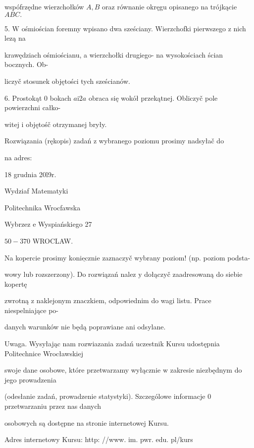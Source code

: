 \documentclass[a4paper,12pt]{article}
\begin{document}
wspófrzędne wierzchołków $A, B$ oraz równanie okręgu opisanego na trójkącie $ABC.$

5. $\mathrm{W}$ ośmiościan foremny wpisano dwa sześciany. Wierzchofki pierwszego $\mathrm{z}$ nich lezą na

krawędziach ośmiościanu, a wierzchołki drugiego- na wysokościach ścian bocznych. Ob-

liczyč stosunek objętości tych sześcianów.

6. Prostokąt $0$ bokach $a\mathrm{i}2a$ obraca się wokół przekątnej. Obliczyč pole powierzchni całko-

witej $\mathrm{i}$ objętośč otrzymanej bryły.

Rozwiązania (rękopis) zadań z wybranego poziomu prosimy nadsyłač do

na adres:

18 grudnia 20l9r.

Wydziaf Matematyki

Politechnika Wrocfawska

Wybrzez $\mathrm{e}$ Wyspiańskiego 27

$50-370$ WROCLAW.

Na kopercie prosimy $\underline{\mathrm{k}\mathrm{o}\mathrm{n}\mathrm{i}\mathrm{e}\mathrm{c}\mathrm{z}\mathrm{n}\mathrm{i}\mathrm{e}}$ zaznaczyč wybrany poziom! (np. poziom podsta-

wowy lub rozszerzony). Do rozwiązań nalez $\mathrm{y}$ dołączyč zaadresowaną do siebie kopertę

zwrotną $\mathrm{z}$ naklejonym znaczkiem, odpowiednim do wagi listu. Prace niespelniające po-

danych warunków nie będą poprawiane ani odsylane.

Uwaga. Wysyłając nam rozwiazania zadań uczestnik Kursu udostępnia Politechnice Wrocławskiej

swoje dane osobowe, które przetwarzamy wyłącznie $\mathrm{w}$ zakresie niezbędnym do jego prowadzenia

(odesłanie zadań, prowadzenie statystyki). Szczególowe informacje $0$ przetwarzaniu przez nas danych

osobowych są dostępne na stronie internetowej Kursu.

Adres internetowy Kursu: http: //www. im. pwr. edu. pl/kurs
\end{document}
